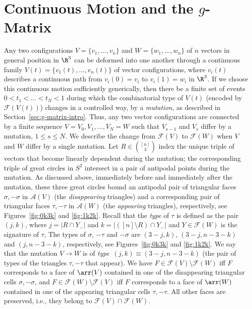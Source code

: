\section{Continuous Motion and the $g$-Matrix}
\label{sec:g-matrix}
%
Any two configurations $V=\{v_1,\dots,v_n\}$ and $W=\{w_1,\dots,w_n\}$ of $n$ vectors in general position in $\R^3$ can be deformed into one another through a continuous family $V(t)=\{v_1(t),\dots,v_n(t)\}$ of vector configurations, where $v_i(t)$ describes a continuous path from $v_i(0)=v_i$ to $v_i(1)=w_i$ in $\R^3$. If we choose this continuous motion sufficiently generically, then there be a finite set of events $0 < t_1 < \dots < t_N < 1$
during which the combinatorial type of $V(t)$ (encoded by $\mathcal{F}(V(t))$) changes in a controlled way, by a \emph{mutation}, as described in Section~\ref{sec:g-matrix-intro}. Thus, any two vector configurations are connected by a finite sequence $V=V_0,V_1,\dots,V_N=W$ such that $V_{s-1}$ and $V_s$ differ by a mutation, $1\leq s\leq N$. 
%
We describe the change from $\mathcal{F}(V)$ to $\mathcal{F}(W)$ when $V$ and $W$ differ by a single mutation. 
Let $R \in \binom{[n]}{3}$ index the unique triple of vectors that become linearly dependent during the mutation; the corresponding triple of great circles in $S^2$ intersect in a pair of antipodal points during the mutation. As discussed above, immediately before and immediately after the mutation, these three great circles bound an antipodal pair of triangular faces $\sigma,-\sigma$ in $\mathcal{A}(V)$ 
(the \emph{disappearing} triangles) and a corresponding pair of triangular faces $\tau,-\tau$ in $\mathcal{A}(W)$ (the \emph{appearing} triangles), respectively, see Figures~\ref{fig:0k3k} and \ref{fig:1k2k}. 
%
Recall that the \emph{type} of $\tau$ is defined as the pair $(j,k)$, where $j=|R\cap Y_-|$ and $k=|([n]\setminus R)\cap Y_-|$ and $Y\in \mathcal{F}(W)$ is the signature of $\tau$,
The types of $\sigma$, $-\tau$ and $-\sigma$ are $(3-j,k)$, $(3-j,n-3-k)$ and $(j,n-3-k)$, respectively, see Figures~\ref{fig:0k3k} and \ref{fig:1k2k}.
We say that the mutation $V\to W$ is of \emph{type~$(j,k)\equiv(3-j,n-3-k)$} (the pair of types of the triangles $\tau,-\tau$ that appear). 
%
%
We have $F\in \mathcal{F}(V)\setminus \mathcal{F}(W)$ iff $F$ corresponds to a face of $\arr(V)$ contained in one of the disappearing triangular cells $\sigma,-\sigma$, and $F\in \mathcal{F}(W)\setminus \mathcal{F}(V)$ iff $F$ corresponds to a face of $\arr(W)$ contained in one of the appearing triangular cells $\tau,-\tau$. All other faces are preserved, i.e., they belong to $\mathcal{F}(V) \cap \mathcal{F}(W)$. 
